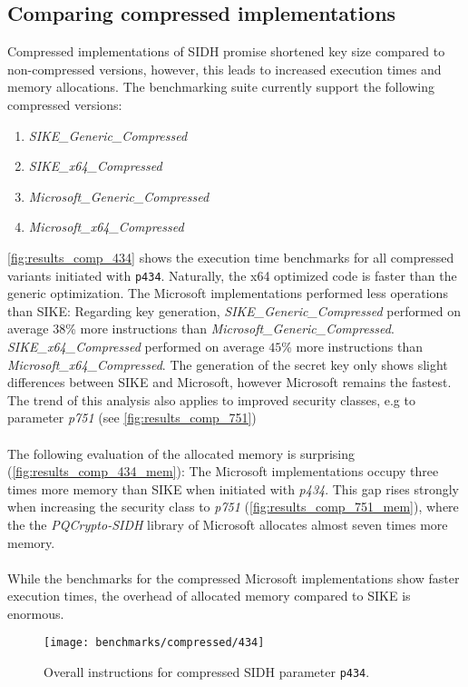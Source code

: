 \subsection{Comparing compressed implementations}\label{sec:analysis_compressed}
Compressed implementations of \gls{SIDH} promise shortened key size compared to non-compressed versions, however, this leads to increased execution times and memory allocations. The benchmarking suite currently support the following compressed versions:
\begin{enumerate}
\item \textit{SIKE\_Generic\_Compressed}
\item \textit{SIKE\_x64\_Compressed}
\item \textit{Microsoft\_Generic\_Compressed}
\item \textit{Microsoft\_x64\_Compressed}
\end{enumerate}
\autoref{fig:results_comp_434} shows the execution time benchmarks for all compressed variants initiated with \texttt{p434}. Naturally, the x64 optimized code is faster than the generic optimization. The Microsoft implementations performed less operations than \gls{SIKE}: Regarding key generation, \textit{SIKE\_Generic\_Compressed} performed on average $38$\% more instructions than \textit{Microsoft\_Generic\_Compressed}. \textit{SIKE\_x64\_Compressed} performed on average $45$\% more instructions than \textit{Microsoft\_x64\_Compressed}. The generation of the secret key only shows slight differences between \gls{SIKE} and Microsoft, however Microsoft remains the fastest. The trend of this analysis also applies to improved security classes, e.g to parameter \textit{p751} (see \autoref{fig:results_comp_751})
\\\\
The following evaluation of the allocated memory is surprising (\autoref{fig:results_comp_434_mem}): The Microsoft implementations occupy three times more memory than \gls{SIKE} when initiated with \textit{p434}. This gap rises strongly when increasing the security class to \textit{p751} (\autoref{fig:results_comp_751_mem}), where the the \textit{ \gls{PQCrypto-SIDH}} library of Microsoft allocates almost seven times more memory.
\\\\
While the benchmarks for the compressed Microsoft implementations show faster execution times, the overhead of allocated memory compared to \gls{SIKE} is enormous.

\begin{figure}[H]
  \centering
  \texttt{[image: benchmarks/compressed/434]}
  \caption[Overall instructions compressed p434]
  {Overall instructions for compressed \gls{SIDH} parameter \texttt{p434}.}
  \label{fig:results_comp_434}
\end{figure}

